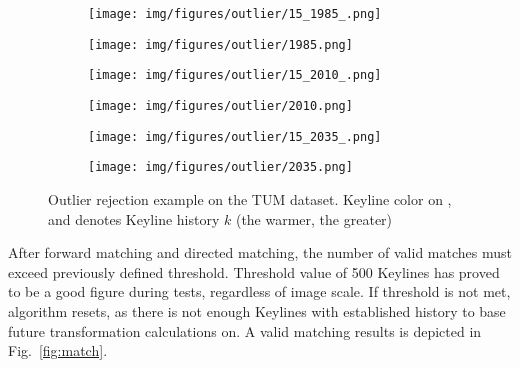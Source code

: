 \begin{figure}[hp]
	\centering
	\begin{subfigure}{0.45\textwidth}
		\centering\texttt{[image: img/figures/outlier/15\_1985\_.png]}
		\subcaption{\label{fig:outlier_a}}
	\end{subfigure}
	\begin{subfigure}{0.45\textwidth}
		\centering\texttt{[image: img/figures/outlier/1985.png]}
		\subcaption{\label{fig:outlier_b}}
	\end{subfigure}
	\begin{subfigure}{0.45\textwidth}
		\centering\texttt{[image: img/figures/outlier/15\_2010\_.png]}
		\subcaption{\label{fig:outlier_c}}
	\end{subfigure}
	\begin{subfigure}{0.45\textwidth}
		\centering\texttt{[image: img/figures/outlier/2010.png]}
		\subcaption{\label{fig:outlier_d}}
	\end{subfigure}
	\begin{subfigure}{0.45\textwidth}
		\centering\texttt{[image: img/figures/outlier/15\_2035\_.png]}
		\subcaption{\label{fig:outlier_e}}
	\end{subfigure}
	\begin{subfigure}{0.45\textwidth}
		\centering\texttt{[image: img/figures/outlier/2035.png]}
		\subcaption{\label{fig:outlier_f}}
	\end{subfigure}
	
	\caption{\label{fig:outliers} Outlier rejection example on the TUM \cite{tum} dataset. Keyline color on \protect{}, \protect{} and \protect{} denotes Keyline history $k$ (the warmer, the greater)}
\end{figure}

After forward matching and directed matching, the number of valid matches must exceed previously defined threshold. Threshold value of 500 Keylines has proved to be a good figure during tests, regardless of image scale.  If threshold is not met, algorithm resets, as there is not enough Keylines with established history to base future transformation calculations on. A valid matching results is depicted in Fig.~\ref{fig:match}.

